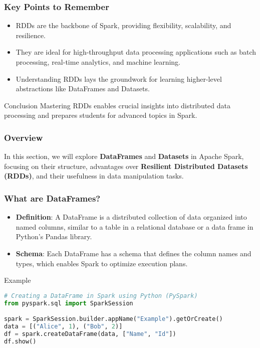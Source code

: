 \documentclass[aspectratio=169]{beamer}
\begin{document}
\begin{frame}[fragile]
    \frametitle{Key Points to Remember}
    \begin{itemize}
        \item RDDs are the backbone of Spark, providing flexibility, scalability, and resilience.
        \item They are ideal for high-throughput data processing applications such as batch processing, real-time analytics, and machine learning.
        \item Understanding RDDs lays the groundwork for learning higher-level abstractions like DataFrames and Datasets.
    \end{itemize}
    \begin{block}{Conclusion}
        Mastering RDDs enables crucial insights into distributed data processing and prepares students for advanced topics in Spark.
    \end{block}
\end{frame}

\begin{frame}
    \titlepage
\end{frame}

\begin{frame}
    \frametitle{Overview}
    In this section, we will explore \textbf{DataFrames} and \textbf{Datasets} in Apache Spark, focusing on their structure, advantages over \textbf{Resilient Distributed Datasets (RDDs)}, and their usefulness in data manipulation tasks.
\end{frame}

\begin{frame}[fragile]
    \frametitle{What are DataFrames?}
    \begin{itemize}
        \item \textbf{Definition}: A DataFrame is a distributed collection of data organized into named columns, similar to a table in a relational database or a data frame in Python's Pandas library.
        \item \textbf{Schema}: Each DataFrame has a schema that defines the column names and types, which enables Spark to optimize execution plans.
    \end{itemize}
    \begin{block}{Example}
        \begin{lstlisting}[language=python]
# Creating a DataFrame in Spark using Python (PySpark)
from pyspark.sql import SparkSession

spark = SparkSession.builder.appName("Example").getOrCreate()
data = [("Alice", 1), ("Bob", 2)]
df = spark.createDataFrame(data, ["Name", "Id"])
df.show()
        \end{lstlisting}
    \end{block}
\end{frame}
\end{document}
